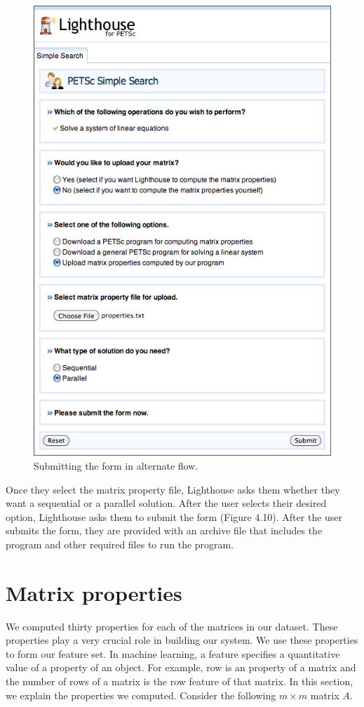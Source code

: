 \begin{figure}[H]\label{petscui9}
  \centering
  \includegraphics[width=4.5in]{figs/petsc_9}
  \caption[Submitting the form in alternate flow.]
   {Submitting the form in alternate flow.}
\end{figure}

\noindent Once they select the matrix property file, Lighthouse asks them whether they want a sequential or a parallel solution. After the user selects their desired option, Lighthouse asks them to submit the form (Figure 4.10). After the user submits the form, they are provided with an archive file that includes the program and other required files to run the program.

\section{Matrix properties}

We computed thirty properties for each of the matrices in our dataset. These properties play a very crucial role in building our system. We use these properties to form our feature set. In machine learning, a feature specifies a quantitative value of a property of an object. For example, row is an property of a matrix and the number of rows of a matrix is the row feature of that matrix. In this section, we explain the properties we computed. Consider the following $m \times m$ matrix $A$.

